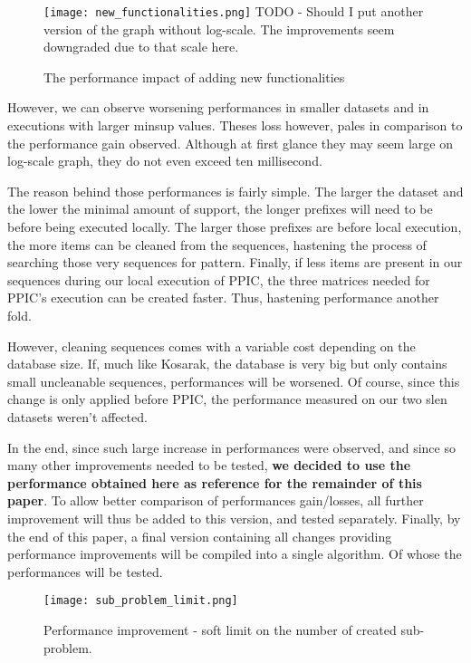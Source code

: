 \documentclass{eplmastersthesis}
\begin{document}
\begin{figure}[h]
  \centering
  \texttt{[image: new\_functionalities.png]}
  TODO - Should I put another version of the graph without log-scale. The improvements seem downgraded due to that scale here.
  \caption{The performance impact of adding new functionalities}
  \label{fig:new_functionalities_perf}
\end{figure}

However, we can observe worsening performances in smaller datasets and in executions with larger minsup values. Theses loss however, pales in comparison to the performance gain observed. Although at first glance they may seem large on log-scale graph, they do not even exceed ten millisecond. \newline

The reason behind those performances is fairly simple. The larger the dataset and the lower the minimal amount of support, the longer prefixes will need to be before being executed locally. The larger those prefixes are before local execution, the more items can be cleaned from the sequences, hastening the process of searching those very sequences for pattern. Finally, if less items are present in our sequences during our local execution of PPIC, the three matrices needed for PPIC's execution can be created faster. Thus, hastening performance another fold. \newline

However, cleaning sequences comes with a variable cost depending on the database size. If, much like Kosarak, the database is very big but only contains small uncleanable sequences, performances will be worsened. Of course, since this change is only applied before PPIC, the performance measured on our two slen datasets weren't affected. \newline

In the end, since such large increase in performances were observed, and since so many other improvements needed to be tested, \textbf{we decided to use the performance obtained here as reference for the remainder of this paper}. To allow better comparison of performances gain/losses, all further improvement will thus be added to this version, and tested separately. Finally, by the end of this paper, a final version containing all changes providing performance improvements will be compiled into a single algorithm. Of whose the performances will be tested.

\begin{figure}[h]
  \centering
  \texttt{[image: sub\_problem\_limit.png]}
  \caption{Performance improvement - soft limit on the number of created sub-problem.}
  \label{fig:sub_problem_limit}
\end{figure}
\end{document}
